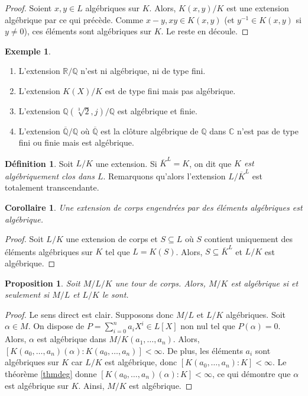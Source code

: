\documentclass{article}
\newcommand{\Q}{\mathbb{Q}}
\newcommand{\R}{\mathbb{R}}
\newcommand{\C}{\mathbb{C}}
\theoremstyle{plain}
\newtheorem{proposition}[theorem]{Proposition}
\newtheorem{corollary}[theorem]{Corollaire}
\theoremstyle{definition}
\newtheorem{definition}[theorem]{Définition}
\newtheorem{example}[theorem]{Exemple}
\theoremstyle{remark}
\begin{document}
\begin{proof}
    Soient $x,y \in L$ algébriques sur $K$. Alors, $K(x,y)/K$ est une extension algébrique par ce qui précède. Comme $x-y, xy \in K(x,y)$ (et $y^{-1} \in K(x,y)$ si $y \neq 0$), ces éléments sont algébriques sur $K$. Le reste en découle.
\end{proof}

\begin{example} \leavevmode
    \begin{enumerate}
        \item L'extension $\R/\Q$ n'est ni algébrique, ni de type fini.
        \item L'extension $K(X)/K$ est de type fini mais pas algébrique.
        \item L'extension $\Q(\sqrt[3]{2},j)/\Q$ est algébrique et finie.
        \item L'extension $\overline{\Q}/\Q$ où $\overline{\Q}$ est la clôture algébrique de $\Q$ dans $\C$ n'est pas de type fini ou finie mais est algébrique.
    \end{enumerate}
\end{example}

\begin{definition}
    Soit $L/K$ une extension. Si $\overline{K}^L = K$, on dit que \emph{$K$ est algébriquement clos dans $L$}. Remarquons qu'alors l'extension $L/\overline{K}^L$ est totalement transcendante.
\end{definition}

\begin{corollary}
    Une extension de corps engendrées par des éléments algébriques est algébrique.
\end{corollary}

\begin{proof}
    Soit $L/K$ une extension de corps et $S \subseteq L$ où $S$ contient uniquement des éléments algébriques sur $K$ tel que $L = K(S)$. Alors, $S\subseteq \overline{K}^L$ et $L/K$ est algébrique.
\end{proof}

\begin{proposition}
    Soit $M/L/K$ une tour de corps. Alors, $M/K$ est algébrique si et seulement si $M/L$ et $L/K$ le sont.
\end{proposition}

\begin{proof}
    Le sens direct est clair. Supposons donc $M/L$ et $L/K$ algébriques. Soit $\alpha \in M$. On dispose de $P = \sum\limits_{i=0}^n a_i X^i \in L[X]$ non nul tel que $P(\alpha) = 0$. Alors, $\alpha$ est algébrique dans $M/K(a_1,\dots,a_n)$. Alors, $[K(a_0,\dots,a_n)(\alpha) : K(a_0,\dots,a_n)] < \infty$. De plus, les éléments $a_i$ sont algébriques sur $K$ car $L/K$ est algébrique, donc $[K(a_0,\dots,a_n) : K] < \infty$. Le théorème \ref{thmdeg} donne $[K(a_0,\dots,a_n)(\alpha) : K] < \infty$, ce qui démontre que $\alpha$ est algébrique sur $K$. Ainsi, $M/K$ est algébrique.
\end{proof}
\end{document}
